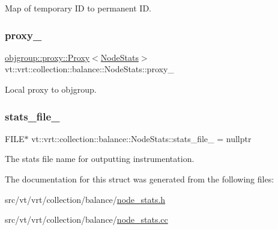 Map of temporary ID to permanent ID. 

\mbox{\label{structvt_1_1vrt_1_1collection_1_1balance_1_1_node_stats_ab0f4d7d14401bec36a6bfca304935032}} 
\subsubsection{\texorpdfstring{proxy\+\_\+}{proxy\_}}
{\footnotesize\ttfamily \hyperlink{structvt_1_1objgroup_1_1proxy_1_1_proxy}{objgroup\+::proxy\+::\+Proxy}$<$\hyperlink{structvt_1_1vrt_1_1collection_1_1balance_1_1_node_stats}{Node\+Stats}$>$ vt\+::vrt\+::collection\+::balance\+::\+Node\+Stats\+::proxy\+\_\+\hspace{0.3cm}{\ttfamily [private]}}



Local proxy to objgroup. 

\mbox{\label{structvt_1_1vrt_1_1collection_1_1balance_1_1_node_stats_a8f2c59c675643634d8e4d2d5ba89ecbd}} 
\subsubsection{\texorpdfstring{stats\+\_\+file\+\_\+}{stats\_file\_}}
{\footnotesize\ttfamily F\+I\+LE$\ast$ vt\+::vrt\+::collection\+::balance\+::\+Node\+Stats\+::stats\+\_\+file\+\_\+ = nullptr\hspace{0.3cm}{\ttfamily [private]}}



The stats file name for outputting instrumentation. 



The documentation for this struct was generated from the following files\+:\begin{DoxyCompactItemize}
\item 
src/vt/vrt/collection/balance/\hyperlink{node__stats_8h}{node\+\_\+stats.\+h}\item 
src/vt/vrt/collection/balance/\hyperlink{node__stats_8cc}{node\+\_\+stats.\+cc}\end{DoxyCompactItemize}
